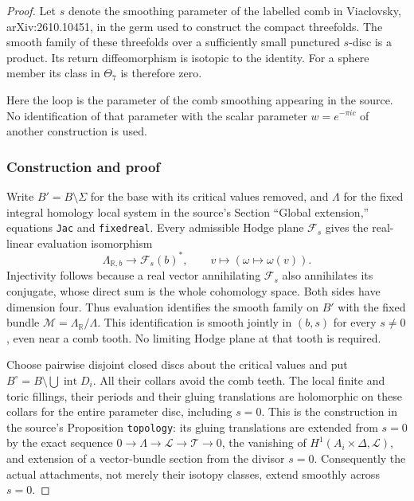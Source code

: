 \begin{proof}
Let \(s\) denote the smoothing parameter of the labelled comb in Viaclovsky, arXiv:2610.10451, in the germ used to construct the compact threefolds. The smooth family of these threefolds over a sufficiently small punctured \(s\)-disc is a product. Its return diffeomorphism is isotopic to the identity. For a sphere member its class in \(\Theta _7\) is therefore zero.

Here the loop is the parameter of the comb smoothing appearing in the source. No identification of that parameter with the scalar parameter \(w=e^{-\pi i c}\) of another construction is used.

\subsubsection{Construction and proof}\label{construction-and-proof}

Write \(B'=B\setminus\Sigma\) for the base with its critical values removed, and \(\Lambda\) for the fixed integral homology local system in the source's Section ``Global extension,'' equations \texttt{Jac} and \texttt{fixedreal}. Every admissible Hodge plane \(\mathcal F_s\) gives the real-linear evaluation isomorphism \[
 \Lambda_{\mathbb R,b}\longrightarrow\mathcal F_s(b)^*,
 \qquad v\longmapsto(\omega\longmapsto\omega(v)).
\] Injectivity follows because a real vector annihilating \(\mathcal F_s\) also annihilates its conjugate, whose direct sum is the whole cohomology space. Both sides have dimension four. Thus evaluation identifies the smooth family on \(B'\) with the fixed bundle \(\mathscr M=\Lambda_{\mathbb R}/\Lambda\). This identification is smooth jointly in \((b,s)\) for every \(s\ne0\), even near a comb tooth. No limiting Hodge plane at that tooth is required.

Choose pairwise disjoint closed discs about the critical values and put \(B^\circ=B\setminus\bigcup\operatorname{int}D_i\). All their collars avoid the comb teeth. The local finite and toric fillings, their periods and their gluing translations are holomorphic on these collars for the entire parameter disc, including \(s=0\). This is the construction in the source's Proposition \texttt{topology}: its gluing translations are extended from \(s=0\) by the exact sequence \(0\to\Lambda\to\mathcal L\to\mathcal T\to0\), the vanishing of \(H^1(A_i\times\Delta,\mathcal L)\), and extension of a vector-bundle section from the divisor \(s=0\). Consequently the actual attachments, not merely their isotopy classes, extend smoothly across \(s=0\).


\end{proof}

